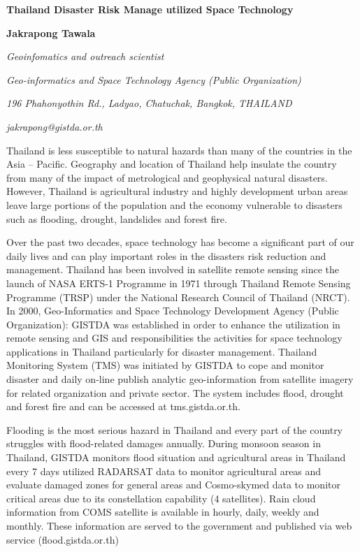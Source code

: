 {
	\begin{center}
	{\large \bfseries Thailand Disaster Risk Manage utilized Space Technology\par}
	\vspace{0.5 cm}
	{\bfseries Jakrapong  Tawala\par}
	{\itshape Geoinfomatics and outreach scientist\par}
	{\itshape Geo-informatics and Space Technology Agency (Public Organization)\par}
	{\itshape 196 Phahonyothin Rd., Ladyao, Chatuchak, Bangkok, THAILAND\par}
	{\itshape jakrapong@gistda.or.th\par}
	\end{center}
	{\tab Thailand is less susceptible to natural hazards than many of the countries in the Asia – Pacific. Geography and location of Thailand help insulate the country from many of the impact of metrological and geophysical natural disasters. However, Thailand is agricultural industry and highly development urban areas leave large portions of the population and the economy vulnerable to disasters such as flooding, drought, landslides and forest fire. 
	
\vspace{0.4 cm}

Over the past two decades, space technology has become a significant part of our daily lives and can play important roles in the disasters risk reduction and management. Thailand has been involved in satellite remote sensing since the launch of NASA ERTS-1 Programme in 1971 through Thailand Remote Sensing Programme (TRSP) under the National Research Council of Thailand (NRCT). In 2000, Geo-Informatics and Space Technology Development Agency (Public Organization): GISTDA was established in order to enhance the utilization in remote sensing and GIS and responsibilities the activities for space technology applications in Thailand particularly for disaster management. Thailand Monitoring System (TMS) was initiated by GISTDA to cope and monitor disaster and daily on-line publish analytic geo-information from satellite imagery for related organization and private sector. The system includes flood, drought and forest fire and can be accessed at tms.gistda.or.th.

\vspace{0.4 cm}

Flooding is the most serious hazard in Thailand and every part of the country struggles with flood-related damages annually.  During monsoon season in Thailand, GISTDA monitors flood situation and agricultural areas in Thailand every 7 days utilized RADARSAT data to monitor agricultural areas and evaluate damaged zones for general areas and Cosmo-skymed data to monitor critical areas due to its constellation capability (4 satellites). Rain cloud information from COMS satellite is available in hourly, daily, weekly and monthly. These information are served to the government and published via web service (flood.gistda.or.th)

}}
